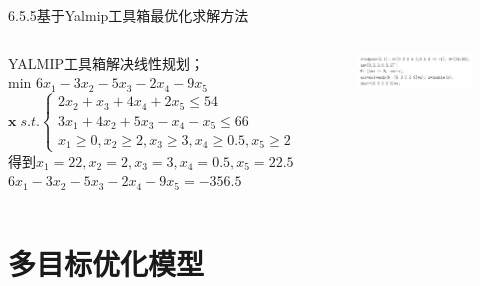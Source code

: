 \documentclass[10pt]{beamer}
\begin{document}
  \begin{frame}[allowframebreaks]{6.5.5基于Yalmip工具箱最优化求解方法}
    \begin{columns}[T]

  
  YALMIP工具箱解决线性规划；
  \\	\qquad \qquad\qquad\qquad min \qquad 
  $
  6x_{1}-3x_{2}-5x_{3}-2x_{4}-9x_{5} 
  $
  \\\qquad\qquad\qquad
    $\textbf{x}\;s.t.
  \left\{
  \begin{array}{ccc}
  2x_{2}+x_{3}+4x_{4}+2x_{5} \leq 54 \\
  3x_{1}+4x_{2}+5x_{3}-x_{4}-x_{5} \leq 66\\
  x_{1}\geq 0,x_{2}\geq 2,x_{3}\geq3, x_{4}\geq 0.5,x_{5} \geq 2
  \end{array} 
  \right.
  $
  得到$x_{1}=22,x_{2}= 2,x_{3}=3, x_{4}= 0.5,x_{5} = 22.5$
  \\$
  6x_{1}-3x_{2}-5x_{3}-2x_{4}-9x_{5} =-356.5
  $
  
  

  \begin{figure}[htp]
    \centering
    \includegraphics[width=1.1\textwidth]{52.jpeg}
    \caption{}
  \end{figure}
\end{columns}

  \end{frame}

\section{多目标优化模型}
\end{document}
